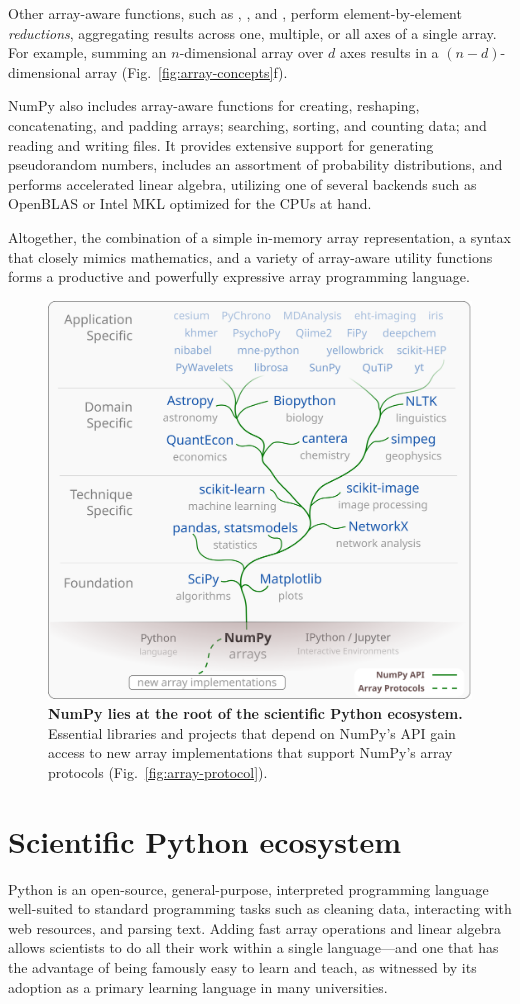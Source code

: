 Other array-aware functions, such as , , and , perform
element-by-element \emph{reductions}, aggregating results across one,
multiple, or all axes of a single array.
For example, summing an $n$-dimensional array over $d$ axes results in a
$(n-d)$-dimensional array (Fig.~\ref{fig:array-concepts}f).

NumPy also includes array-aware functions for creating, reshaping, concatenating, and padding
arrays; searching, sorting, and counting data; and reading and writing files.
It provides extensive support for generating pseudorandom numbers,
includes an assortment of probability distributions, and
performs accelerated linear algebra, utilizing one of several backends
such as OpenBLAS \cite{wang2013augem,xianyi2012model} or Intel MKL optimized
for the CPUs at hand.

Altogether, the combination of a simple in-memory array
representation, a syntax that closely mimics mathematics, and a
variety of array-aware utility functions forms a productive and
powerfully expressive array programming language.

\begin{figure}
  \centering
  \includegraphics[width=.45\textwidth]{static/sketches/ecosystem}
  \caption{\textbf{NumPy lies at the root of the scientific Python ecosystem.}
   Essential libraries and projects that depend on NumPy's API gain access to new array
   implementations that support NumPy's array protocols (Fig.~\ref{fig:array-protocol}).
  }
  \label{fig:ecosystem}
\end{figure}

\section*{Scientific Python ecosystem}

Python is an open-source, general-purpose, interpreted programming language
well-suited to standard programming tasks such as cleaning data,
interacting with web resources, and parsing text.
Adding fast array operations and linear algebra allows scientists to do all
their work within a single language---and one that has the advantage of
being famously easy to learn and teach, as witnessed by its adoption
as a primary learning language in many universities.


